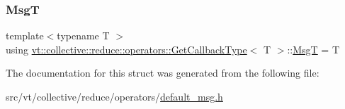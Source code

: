 \mbox{\label{structvt_1_1collective_1_1reduce_1_1operators_1_1_get_callback_type_3_01_t_01_4_a84d837c46c05baf26b4b53a52320017d}} 
\subsubsection{\texorpdfstring{MsgT}{MsgT}}
{\footnotesize\ttfamily template$<$typename T $>$ \\
using \hyperlink{structvt_1_1collective_1_1reduce_1_1operators_1_1_get_callback_type}{vt\+::collective\+::reduce\+::operators\+::\+Get\+Callback\+Type}$<$ T $>$\+::\hyperlink{structvt_1_1collective_1_1reduce_1_1operators_1_1_get_callback_type_3_01_t_01_4_a84d837c46c05baf26b4b53a52320017d}{MsgT} =  T}



The documentation for this struct was generated from the following file\+:\begin{DoxyCompactItemize}
\item 
src/vt/collective/reduce/operators/\hyperlink{default__msg_8h}{default\+\_\+msg.\+h}\end{DoxyCompactItemize}

